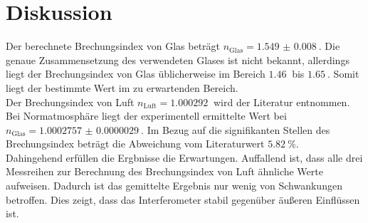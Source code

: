 \section{Diskussion}
\label{sec:Diskussion}

Der berechnete Brechungsindex von Glas beträgt $n_\text{Glas} = \qty{1.549(8)}{}$.
Die genaue Zusammensetzung des verwendeten Glases ist nicht bekannt, allerdings liegt der Brechungsindex von Glas üblicherweise im Bereich $\qty{1.46}{}$ bis $\qty{1.65}{}$.\cite{index}
Somit liegt der bestimmte Wert im zu erwartenden Bereich.
\\
Der Brechungsindex von Luft $n_\text{Luft} = \qty{1.000292}{}$ wird der Literatur entnommen. \cite{index}
Bei Normatmosphäre liegt der experimentell ermittelte Wert bei $n_\text{Glas} = \qty{1.0002757(29)}{}$.
Im Bezug auf die signifikanten Stellen des Brechungsindex beträgt die Abweichung vom Literaturwert $\qty{5.82}{\percent}$.
\\
Dahingehend erfüllen die Ergbnisse die Erwartungen. 
Auffallend ist, dass alle drei Messreihen zur Berechnung des Brechungsindex von Luft ähnliche Werte aufweisen.
Dadurch ist das gemittelte Ergebnis nur wenig von Schwankungen betroffen.
Dies zeigt, dass das Interferometer stabil gegenüber äußeren Einflüssen ist.